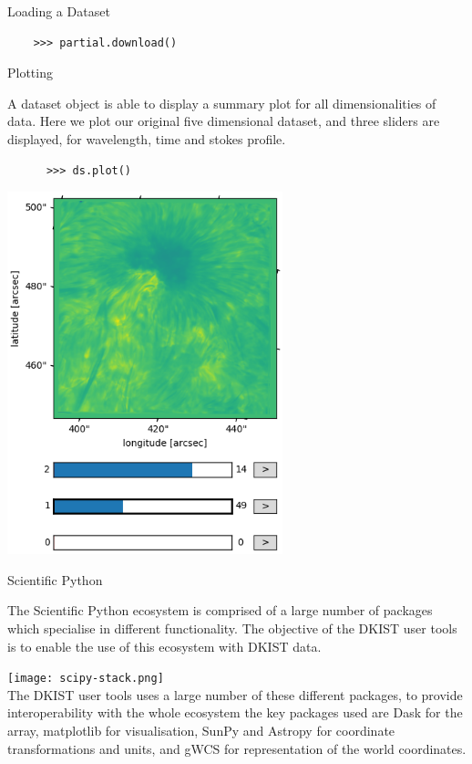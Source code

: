 \documentclass[a0paper,landscape,fontscale=0.3]{baposter}
\begin{document}
\begin{poster}
\begin{posterbox}[name=dataset,column=2,row=0,span=2]{Loading a Dataset}
\begin{verbatim}
    >>> partial.download()
  \end{verbatim}

  
\end{posterbox}

\begin{posterbox}[name=scipy,column=2,row=0,span=1,below=dataset]{Plotting}

  A dataset object is able to display a summary plot for all dimensionalities of
  data. Here we plot our original five dimensional dataset, and three sliders
  are displayed, for wavelength, time and stokes profile.

  \begin{verbatim}
      >>> ds.plot()
  \end{verbatim}

  \begin{center}
    \includegraphics[width=0.60\textwidth]{5d-animator.png}
  \end{center}
  
\end{posterbox}

\begin{posterbox}[name=scipy,column=3,row=0,span=1,below=dataset]{Scientific Python}

  The Scientific Python ecosystem is comprised of a large number of packages
  which specialise in different functionality. The objective of the DKIST user
  tools is to enable the use of this ecosystem with DKIST data.
  
  \texttt{[image: scipy-stack.png]}\\[0.1em]

  The DKIST user tools uses a large number of these different packages, to
  provide interoperability with the whole ecosystem the key packages used are Dask
  for the array, matplotlib for visualisation, SunPy and Astropy for coordinate
  transformations and units, and gWCS for representation of the world coordinates.

\end{posterbox}

\end{poster}
\end{document}
